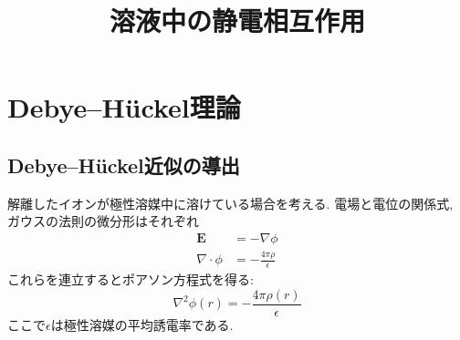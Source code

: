 





\title{溶液中の静電相互作用}
\maketitle

\section{Debye--H\"{u}ckel理論}
\subsection{Debye--H\"{u}ckel近似の導出}
解離したイオンが極性溶媒中に溶けている場合を考える.
電場と電位の関係式, ガウスの法則の微分形はそれぞれ
\begin{align}
    \bm{E} &= - \nabla \phi
    \\
    \nabla \cdot \phi &= - \frac{4\pi\rho}{\epsilon}
\end{align}
これらを連立するとポアソン方程式を得る:
\begin{equation}
    \nabla^{2} \phi(r) = - \frac{4\pi\rho(r)}{\epsilon}
    \label{Eq:Poisson-Equation}
\end{equation}
ここで$\epsilon$は極性溶媒の平均誘電率である.

